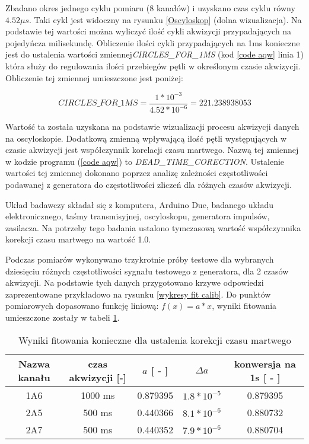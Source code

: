 Zbadano okres jednego cyklu pomiaru (8 kanałów) i uzyskano czas cyklu równy $4.52 \mu s$. Taki cykl jest widoczny na rysunku \ref{Oscyloskop} (dolna wizualizacja).
Na podstawie tej wartości można wyliczyć ilość cykli akwizycji przypadających na pojedyńcza milisekundę. Obliczenie ilości cykli przypadających na 1ms konieczne jest do ustalenia wartości zmiennej\textit{CIRCLES\_FOR\_1MS} (kod \ref{code aqw} linia 1) która służy do regulowania ilości przebiegów pętli w określonym czasie akwizycji. Obliczenie tej zmiennej  umieszczone jest poniżej:

\begin{equation}
        \label{per cykl}
        CIRCLES\_FOR\_1MS = \frac{1*10^{-3}}{4.52 * 10^{-6}} = 221.238938053
\end{equation}


Wartość ta została uzyskana na podstawie wizualizacji procesu akwizycji danych na oscyloskopie. Dodatkową zmienną wpływającą ilość pętli występujących w czasie akwizycji jest współczynnik korelacji czasu martwego. Nazwą tej zmiennej w kodzie programu (\ref{code aqw}) to \textit{DEAD\_TIME\_CORECTION}. Ustalenie wartości tej zmiennej dokonano poprzez analizę zależności częstotliwości podawanej z generatora do częstotliwości zliczeń dla różnych czasów akwizycji. 

Układ badawczy składał się z komputera, Arduino Due, badanego układu elektronicznego, taśmy transmisyjnej, oscyloskopu, generatora impulsów, zasilacza. Na potrzeby tego badania ustalono tymczasową wartość współczynnika korekcji czasu martwego na wartość 1.0.

Podczas pomiarów wykonywano trzykrotnie próby testowe dla wybranych dziesięciu różnych częstotliwości sygnału testowego z generatora, dla 2 czasów akwizycji. Na podstawie tych danych przygotowano krzywe odpowiedzi zaprezentowane przykładowo na rysunku \ref{wykresy fit calib}. Do punktów pomiarowych dopasowano funkcję liniową: $f(x) = a*x$, wyniki fitowania umieszczone zostały w tabeli \ref{dead time fit}.

\begin{table}
        \caption{Wyniki fitowania konieczne dla ustalenia korekcji czasu martwego}
        \label{dead time fit}
        \centering
        \begin{tabular}{|c|c|c|c|c|}
                \hline
                Nazwa kanału & czas akwizycji [-] & $a$ [ - ]& $\Delta a$ & konwersja na 1s [ - ] \\ \hline
                1A6 & 1000 ms & 0.879395 & $1.8 * 10^{-5}$ & 0.879395 \\ \hline
                2A5 & 500 ms & 0.440366 & $8.1 * 10^{-6}$ & 0.880732 \\ \hline
                2A7 & 500 ms & 0.440352 & $7.9 * 10^{-6}$ & 0.880704 \\ \hline
        \end{tabular}
\end{table}

